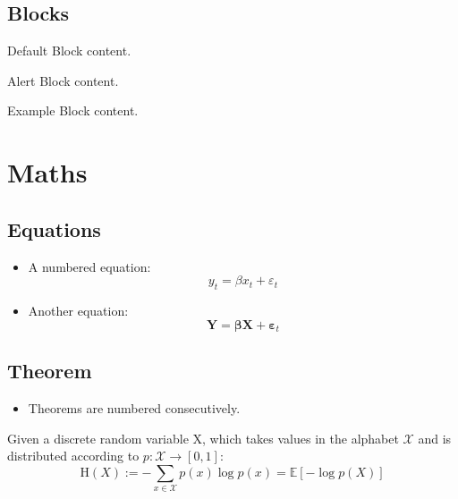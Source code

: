 \documentclass[
11pt,notheorems,hyperref={pdfauthor=whatever}
]{beamer}
\begin{document}
\subsection{Blocks}
\begin{frame}

   \centering
	\begin{minipage}[b]{0.5\textwidth}

	  \begin{block}{Default}
        Block content.
      \end{block}

      \begin{alertblock}{Alert}
        Block content.
      \end{alertblock}

      \begin{exampleblock}{Example}
        Block content.
      \end{exampleblock}      
      
	\end{minipage}	
\end{frame}

\section{Maths}
\subsection{Equations}
\begin{frame}
    \begin{itemize}
        \item A numbered equation:
        \begin{equation}
            y_t = \beta x_t + \varepsilon_t
        \end{equation}
         \item Another equation:
        \begin{equation*}
            \mathbf{Y} = \boldsymbol{\beta} \mathbf{X} + \boldsymbol{\varepsilon}_t
        \end{equation*}
    \end{itemize}
\end{frame}

\subsection{Theorem}
\begin{frame}
    \begin{itemize}
        \item Theorems are numbered consecutively.
    \end{itemize}
    \begin{theorem}
         Given a discrete random variable X, which takes values in the alphabet $\mathcal{X}$ and is distributed according to  $p:{\mathcal {X}}\to [0,1]$:
            \begin{equation}
                \mathrm {H} (X):=-\sum _{x\in {\mathcal {X}}}p(x)\log p(x)=\mathbb {E} [-\log p(X)]
            \end{equation}
    \end{theorem}
\end{frame}
\end{document}
